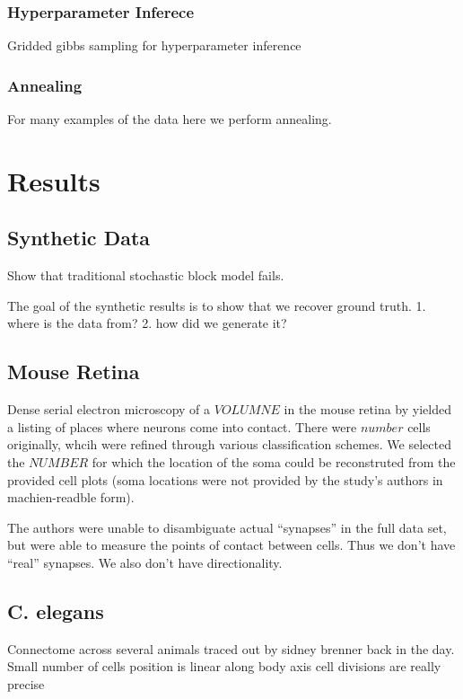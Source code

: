 \documentclass{article}
\begin{document}
\subsubsection{Hyperparameter Inferece}
Gridded gibbs sampling for hyperparameter inference

\subsubsection{Annealing}
For many examples of the data here we perform annealing. 



\section{Results}

\subsection{Synthetic Data}
Show that traditional stochastic block model fails. 


The goal of the synthetic results is to show that we recover ground truth. 
1. where is the data from? 
2. how did we generate it? 


\subsection{Mouse Retina}

Dense serial electron microscopy of a $VOLUMNE$ in the mouse
retina by \autocite{MouseReinta} yielded a listing of places where
neurons come into contact. There were $number$ cells originally, whcih
were refined through various classification schemes. We selected the
$NUMBER$ for which the location of the soma could be reconstruted from
the provided cell plots (soma locations were not provided by the
study's authors in machien-readble form).

The authors were unable to disambiguate actual ``synapses'' in the
full data set, but were able to measure the points of contact between
cells. Thus we don't have ``real'' synapses. We also don't have directionality. 


\subsection{C. elegans}
Connectome across several animals traced out by sidney brenner back in the day.
Small number of cells
position is linear along body axis
cell divisions are really precise
\end{document}
